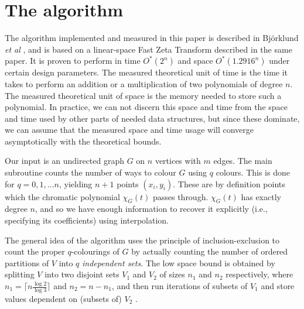 \documentclass[a4paper]{article}
\begin{document}
\section{The algorithm}
The algorithm implemented and measured in this paper is described in Björklund \emph{et al} \cite{cov_pack}, and is based on a linear-space Fast Zeta Transform described in the same paper. It is proven to perform in time $O^*(2^n)$ and space $O^*(1.2916^n)$ under certain design parameters. The measured theoretical unit of time is the time it takes to perform an addition or a multiplication of two polynomials of degree $n$. The measured theoretical unit of space is the memory needed to store such a polynomial. In practice, we can not discern this space and time from the space and time used by other parts of needed data structures, but since these dominate, we can assume that the measured space and time usage will converge asymptotically with the theoretical bounds.

Our input is an undirected graph $G$ on $n$ vertices with $m$ edges\footnotemark. The main subroutine counts the number of ways to colour $G$ using $q$ colours. This is done for $q = 0, 1, \ldots n$, yielding $n + 1$ points $(x_i, y_i)$. These are by definition points which the chromatic polynomial $\chi_G(t)$ passes through. $\chi_G(t)$ has exactly degree $n$, and so we have enough information to recover it explicitly (i.e., specifying its coefficients) using interpolation.

The general idea of the algorithm uses the principle of inclusion-exclusion to count the proper $q$-colourings of $G$ by actually counting the number of ordered partitions of $V$ into $q$ \emph{independent sets}. The low space bound is obtained by splitting $V$ into two disjoint sets $V_1$ and $V_2$ of sizes $n_1$ and $n_2$ respectively, where $n_1 = \lceil n \frac{\log2}{\log3} \rceil$ and $n_2 = n - n_1$, and then run iterations of subsets of $V_1$ and store values dependent on (subsets of) $V_2$ \cite[sec. 5]{cov_pack}. 

\end{document}
